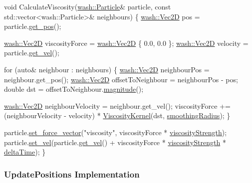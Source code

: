 \begin{DoxyCode}
\textcolor{keywordtype}{void} CalculateViscosity(\mbox{\hyperlink{classwash_1_1Particle}{wash::Particle}}& particle, \textcolor{keyword}{const} std::vector<wash::Particle>& 
      neighbours) \{
    \mbox{\hyperlink{classwash_1_1Vec}{wash::Vec2D}} pos = particle.\mbox{\hyperlink{classwash_1_1Particle_a9d222d453d640cf629ee8dfbee6b43c2}{get\_pos}}();

    \mbox{\hyperlink{classwash_1_1Vec}{wash::Vec2D}} viscosityForce = \mbox{\hyperlink{classwash_1_1Vec}{wash::Vec2D}} \{ 0.0, 0.0 \};
    \mbox{\hyperlink{classwash_1_1Vec}{wash::Vec2D}} velocity = particle.\mbox{\hyperlink{classwash_1_1Particle_a890d0f1467225393e385872b0c98b974}{get\_vel}}();

    \textcolor{keywordflow}{for} (\textcolor{keyword}{auto}& neighbour : neighbours) \{
        \mbox{\hyperlink{classwash_1_1Vec}{wash::Vec2D}} neighbourPos = neighbour.get\_pos();
        \mbox{\hyperlink{classwash_1_1Vec}{wash::Vec2D}} offsetToNeighbour = neighbourPos - pos;
        \textcolor{keywordtype}{double} dst = offsetToNeighbour.\mbox{\hyperlink{classwash_1_1Vec_a41de499daf12160b2cf515ce0c9da70f}{magnitude}}();

        \mbox{\hyperlink{classwash_1_1Vec}{wash::Vec2D}} neighbourVelocity = neighbour.get\_vel();
        viscosityForce += (neighbourVelocity - velocity) * \mbox{\hyperlink{flsim__kernels_8hpp_a5561095f423361bec442d282a4f8a47b}{ViscosityKernel}}(dst, 
      \mbox{\hyperlink{3d__fluid__sim_2fluid__sim_8cpp_aeb9760a781fb6ccf134ed4353c9888e5}{smoothingRadius}});
    \}

    particle.\mbox{\hyperlink{classwash_1_1Particle_a6960cdd169d1829a52e49cf835a8bfeb}{set\_force\_vector}}(\textcolor{stringliteral}{"viscosity"}, viscosityForce * 
      \mbox{\hyperlink{3d__fluid__sim_2fluid__sim_8cpp_a0f2e430964cc73edbaf77b1e4eeb2136}{viscosityStrength}});
    particle.\mbox{\hyperlink{classwash_1_1Particle_a4755365883cfd62117ebe74fe44d35e0}{set\_vel}}(particle.\mbox{\hyperlink{classwash_1_1Particle_a890d0f1467225393e385872b0c98b974}{get\_vel}}() + viscosityForce * 
      \mbox{\hyperlink{3d__fluid__sim_2fluid__sim_8cpp_a0f2e430964cc73edbaf77b1e4eeb2136}{viscosityStrength}} * \mbox{\hyperlink{3d__fluid__sim_2fluid__sim_8cpp_a78e0adba8d27825f587ec87ed578015f}{deltaTime}});
\}
\end{DoxyCode}


\subsubsection*{Update\+Positions Implementation}

